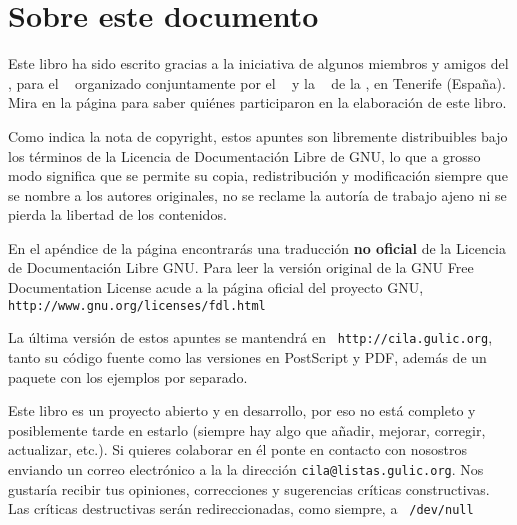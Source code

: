 \section*{Sobre este documento}

Este libro ha sido escrito gracias a la iniciativa de algunos miembros
y amigos  del \GULiC, para  el \CILA~ organizado conjuntamente  por el
\GULiC~  y la  \FMAT~ de  la \ULL,  en Tenerife  (España). Mira  en la
página \pageref{Agradecimientos} para saber  quiénes participaron en la
elaboración de este libro.

Como  indica  la  nota  de copyright,  estos  apuntes  son  libremente
distribuibles bajo los  términos de la {\sf  Licencia de Documentación
Libre de GNU}, lo que a grosso modo significa que se permite su copia,
redistribución  y modificación  siempre que  se nombre  a los  autores
originales, no se reclame la autoría  de trabajo ajeno ni se pierda la
libertad de los contenidos.

En el apéndice de la  página \pageref{GFDL} encontrarás una traducción
{\bf  no oficial}  de la  {\sf Licencia  de Documentación  Libre GNU}.
Para  leer la  versión  original  de la  {\sf  GNU Free  Documentation
License}  acude a  la  página  oficial del  proyecto  {\sf GNU},  {\tt
http://www.gnu.org/licenses/fdl.html}

La   última  versión   de   estos  apuntes   se   mantendrá  en   {\tt
http://cila.gulic.org}, tanto  su código fuente como  las versiones en
PostScript y PDF, además de un paquete con los ejemplos por separado.

Este libro  es un proyecto {\sf  abierto} y en desarrollo,  por eso no
está completo  y posiblemente tarde  en estarlo (siempre hay  algo que
añadir, mejorar, corregir, actualizar,  etc.). Si quieres colaborar en
él ponte en contacto con nosostros enviando un correo electrónico a la
la  dirección {\tt  cila@listas.gulic.org}. Nos  gustaría recibir  tus
opiniones,  correcciones  y  sugerencias críticas  constructivas.  Las
críticas  destructivas serán  redireccionadas,  como  siempre, a  {\tt
/dev/null}

